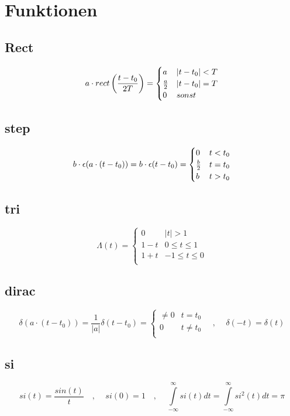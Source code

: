 \documentclass[10pt,a4paper]{article}
\begin{document}
\section{Funktionen}
\subsection{Rect}
\[ a\cdot rect\left(\frac{t-t_0}{2T}\right) = \begin{cases}
a & |t-t_0| < T \\
a\over 2 & |t-t_0| = T \\
0 & sonst \\
\end{cases} \]

\subsection{step}
\[b\cdot\epsilon(a\cdot (t-t_0)) = b\cdot\epsilon(t-t_0) =
\begin{cases}
0 & t < t_0 \\
b \over 2 & t=t_0\\
b & t > t_0\\
\end{cases}\]

\subsection{tri}
\[\Lambda(t) =
\begin{cases}
0& |t|>1\\
1-t & 0 \leq t \leq 1\\
1+t & -1 \leq t \leq 0\\
\end{cases} \]

\subsection{dirac}
\[ \delta(a\cdot (t-t_0)) = \frac{1}{|a|} \delta(t-t_0) =
\begin{cases}
\neq 0 & t=t_0\\
0 & t \neq t_0\\
\end{cases}\,\,\,\,\,\,,\,\,\,\,\,\,\, \delta(-t)=\delta(t) \]

\subsection{si}
\[
si(t) = \frac{sin(t)}{t}\,\,\,\,\,\,,\,\,\,\,\,\,\, si(0) = 1\,\,\,\,\,\,,\,\,\,\,\,\,\, \int\limits_{-\infty}^\infty si(t) dt= \int\limits_{-\infty}^\infty si^2(t) dt = \pi
\]
\end{document}

